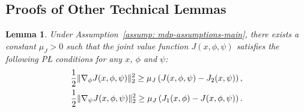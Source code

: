 \documentclass{article}
\theoremstyle{plain}
\newtheorem{lemma}{Lemma}
\theoremstyle{definition}
\theoremstyle{remark}
\begin{document}
\subsection{Proofs of Other Technical Lemmas}
\label{sec: proofs-of-useful-lemmas}

\begin{lemma}
    \label{lemma: pl-condition-joint-value-function}
    Under Assumption~\ref{assump: mdp-assumptions-main}, there exists a constant $\mu_J>0$ such that the joint value function $J(x,\phi,\psi)$ satisfies the following P{\L} conditions for any $x$, $\phi$ and $\psi$:
    \begin{gather}
        \frac{1}{2} \| \nabla_{\phi} J(x,\phi,\psi) \|_2^2 \geq \mu_J \left( J(x,\phi,\psi) - J_2(x,\psi) \right),\notag \\
        \frac{1}{2} \| \nabla_{\psi} J(x,\phi,\psi) \|_2^2 \geq \mu_J \left( J_1(x,\phi) - J(x,\phi,\psi) \right).\notag
    \end{gather}
\end{lemma}
\end{document}
